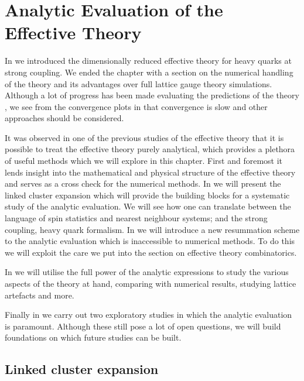 \chapter{Analytic Evaluation of the Effective Theory} \label{chap5}

In  we introduced the dimensionally reduced effective theory for
heavy quarks at strong coupling. We ended the chapter with a section on the
numerical handling of the theory and its advantages over full lattice gauge
theory simulations. Although a lot of progress has been made evaluating the
predictions of the theory \citep{Fromm:2011qi,Fromm:2012eb,Langelage:2014vpa},
we see from the convergence plots in  that
convergence is slow and other approaches should be considered.

It was observed in one of the previous studies of the effective theory
\citep{Langelage:2014vpa} that it is possible to treat the effective theory
purely analytical, which provides a plethora of useful methods which we will
explore in this chapter. First and foremost it lends insight into the
mathematical and physical structure of the effective theory and serves as a
cross check for the numerical methods. In  we will
present the linked cluster expansion which will provide the building blocks for
a systematic study of the analytic evaluation. We will see how one can translate
between the language of spin statistics and nearest neighbour systems; and the
strong coupling, heavy quark formalism. In  we
will introduce a new resummation scheme to the analytic evaluation which is
inaccessible to numerical methods. To do this we will exploit the care we put
into the section on effective theory combinatorics.

In  we will utilise the full power of the analytic
expressions to study the various aspects of the theory at hand, comparing with
numerical results, studying lattice artefacts and more.

Finally in  we carry out two
exploratory studies in which the analytic evaluation is paramount. Although
these still pose a lot of open questions, we will build foundations on which
future studies can be built.

\section{Linked cluster expansion} \label{sec:cluster_expansion}

